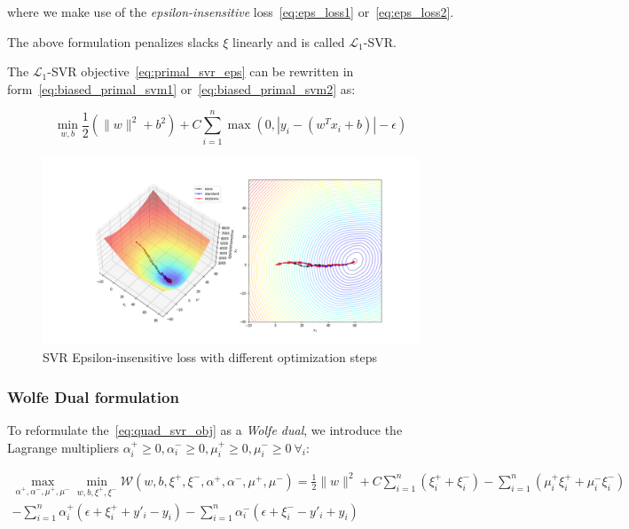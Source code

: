 where we make use of the \emph{epsilon-insensitive} loss~\eqref{eq:eps_loss1} or~\eqref{eq:eps_loss2}.

The above formulation penalizes slacks $\xi$ linearly and is called $\mathcal{L}_1$-SVR.

The $\mathcal{L}_1$-SVR objective~\eqref{eq:primal_svr_eps} can be rewritten in form~\eqref{eq:biased_primal_svm1} or~\eqref{eq:biased_primal_svm2} as:

\begin{equation} \label{eq:biased_primal_svr_eps}
	\min_{w,b} \frac{1}{2} (\| w \|^2 + b^2) + C \sum_{i=1}^n \max(0, |y_i - (w^T x_i + b)| - \epsilon)
\end{equation}

\begin{figure}[h!]
	\centering
  	\includegraphics[scale=0.4]{img/svr_eps_loss}
  	\caption{SVR Epsilon-insensitive loss with different optimization steps}
  	\label{fig:svr_eps_loss}
\end{figure}

\subsubsection{Wolfe Dual formulation}

To reformulate the~\eqref{eq:quad_svr_obj} as a \emph{Wolfe dual}, we introduce the Lagrange multipliers $\alpha_i^+ \geq 0, \alpha_i^- \geq 0, \mu_i^+ \geq 0, \mu_i^- \geq 0 \ \forall_i$:

\begin{equation} \label{eq:svr_wolfe_dual}
	\begin{aligned}
    	\max_{\alpha^+,\alpha^-,\mu^+,\mu^-} \min_{w,b,\xi^+,\xi^-} \mathcal{W}(w,b,\xi^+,\xi^-,\alpha^+,\alpha^-,\mu^+,\mu^-) = \frac{1}{2} \| w \|^2 + C \sum_{i=1}^n (\xi_i^+ + \xi_i^-)-\sum_{i=1}^n (\mu_i^+ \xi_i^+ + \mu_i^- \xi_i^-) \\ -\sum_{i=1}^n \alpha_i^+(\epsilon+\xi_i^+ + y'_i-y_i)-\sum_{i=1}^n \alpha_i^-(\epsilon+\xi_i^- - y'_i+y_i)
	\end{aligned}
\end{equation}

